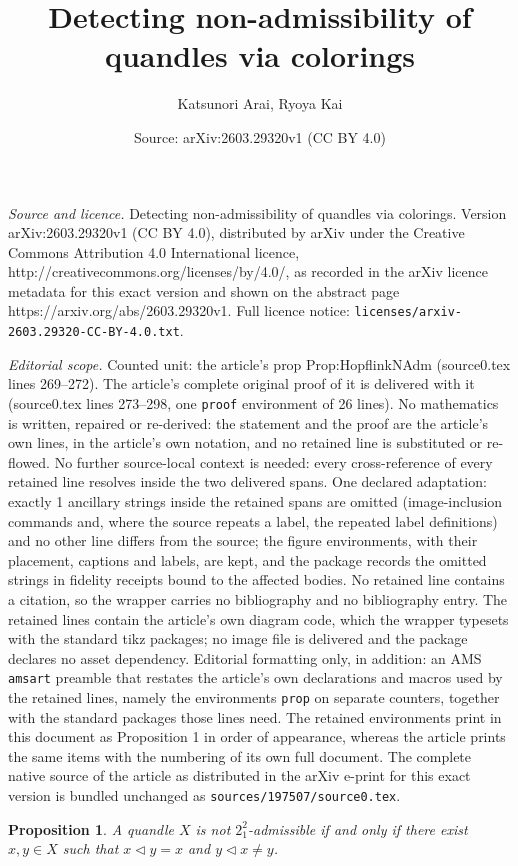 \documentclass[10pt,a4paper]{amsart}
\title{Detecting non-admissibility of quandles via colorings}
\author{Katsunori Arai, Ryoya Kai}
\date{Source: arXiv:2603.29320v1 (CC BY 4.0)}
\newtheorem{prop}{Proposition}
\newcommand{\qop}{\triangleleft}
\begin{document}
\maketitle

\noindent\emph{Source and licence.} Detecting non-admissibility of quandles via colorings. Version arXiv:2603.29320v1 (CC BY 4.0), distributed by arXiv under the Creative Commons Attribution 4.0 International licence, http://creativecommons.org/licenses/by/4.0/, as recorded in the arXiv licence metadata for this exact version and shown on the abstract page https://arxiv.org/abs/2603.29320v1. Full licence notice: \texttt{licenses/arxiv-2603.29320-CC-BY-4.0.txt}.\par\smallskip

\noindent\textit{Editorial scope.} Counted unit: the article's prop Prop:HopflinkNAdm (source0.tex lines 269--272). The article's complete original proof of it is delivered with it (source0.tex lines 273--298, one \texttt{proof} environment of 26 lines). No mathematics is written, repaired or re-derived: the statement and the proof are the article's own lines, in the article's own notation, and no retained line is substituted or re-flowed.  No further source-local context is needed: every cross-reference of every retained line resolves inside the two delivered spans.  One declared adaptation: exactly 1 ancillary strings inside the retained spans are omitted (image-inclusion commands and, where the source repeats a label, the repeated label definitions) and no other line differs from the source; the figure environments, with their placement, captions and labels, are kept, and the package records the omitted strings in fidelity receipts bound to the affected bodies.  No retained line contains a citation, so the wrapper carries no bibliography and no bibliography entry.  The retained lines contain the article's own diagram code, which the wrapper typesets with the standard tikz packages; no image file is delivered and the package declares no asset dependency.  Editorial formatting only, in addition: an AMS \texttt{amsart} preamble that restates the article's own declarations and macros used by the retained lines, namely the environments \texttt{prop} on separate counters, together with the standard packages those lines need.  The retained environments print in this document as Proposition 1 in order of appearance, whereas the article prints the same items with the numbering of its own full document.  The complete native source of the article as distributed in the arXiv e-print for this exact version is bundled unchanged as \texttt{sources/197507/source0.tex}.
\begin{prop}
  A quandle $X$ is not $2_{1}^{2}$-admissible if and only if there exist $x, y \in X$ such that $x \qop y = x$ and $y \qop x \neq y$.
  \label{Prop:HopflinkNAdm}
\end{prop}
\end{document}
